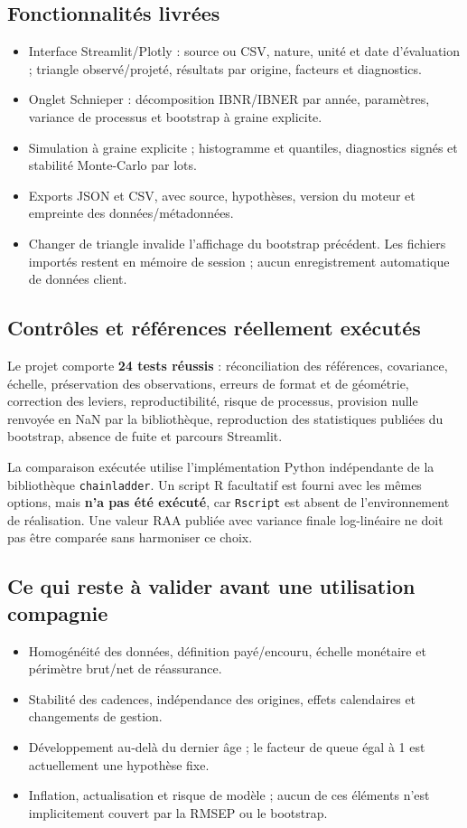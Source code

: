 \documentclass[11pt,a4paper]{article}
\begin{document}
\subsection*{Fonctionnalités livrées}
\begin{itemize}
\item Interface Streamlit/Plotly : source ou CSV, nature, unité et date d'évaluation ; triangle observé/projeté, résultats par origine, facteurs et diagnostics.
\item Onglet Schnieper : décomposition IBNR/IBNER par année, paramètres, variance de processus et bootstrap à graine explicite.
\item Simulation à graine explicite ; histogramme et quantiles, diagnostics signés et stabilité Monte-Carlo par lots.
\item Exports JSON et CSV, avec source, hypothèses, version du moteur et empreinte des données/métadonnées.
\item Changer de triangle invalide l'affichage du bootstrap précédent. Les fichiers importés restent en mémoire de session ; aucun enregistrement automatique de données client.
\end{itemize}

\subsection*{Contrôles et références réellement exécutés}
Le projet comporte \textbf{24 tests réussis} : réconciliation des références, covariance, échelle, préservation des observations, erreurs de format et de géométrie, correction des leviers, reproductibilité, risque de processus, provision nulle renvoyée en NaN par la bibliothèque, reproduction des statistiques publiées du bootstrap, absence de fuite et parcours Streamlit.

La comparaison exécutée utilise l'implémentation Python indépendante de la bibliothèque \texttt{chainladder}. Un script R facultatif est fourni avec les mêmes options, mais \textbf{n'a pas été exécuté}, car \texttt{Rscript} est absent de l'environnement de réalisation. Une valeur RAA publiée avec variance finale log-linéaire ne doit pas être comparée sans harmoniser ce choix.

\subsection*{Ce qui reste à valider avant une utilisation compagnie}
\begin{itemize}
\item Homogénéité des données, définition payé/encouru, échelle monétaire et périmètre brut/net de réassurance.
\item Stabilité des cadences, indépendance des origines, effets calendaires et changements de gestion.
\item Développement au-delà du dernier âge ; le facteur de queue égal à 1 est actuellement une hypothèse fixe.
\item Inflation, actualisation et risque de modèle ; aucun de ces éléments n'est implicitement couvert par la RMSEP ou le bootstrap.
\end{itemize}
\end{document}
